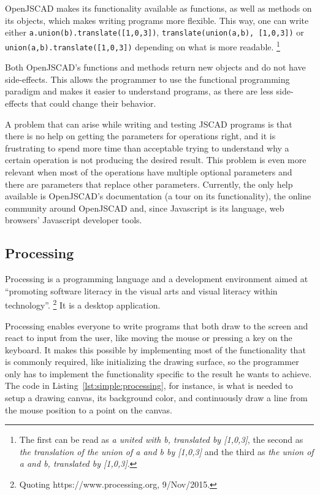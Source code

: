 OpenJSCAD makes its functionality available as functions, as well as methods on its objects, which makes writing programs more flexible.
This way, one can write either \texttt{a.union(b).translate([1,0,3])}, \texttt{translate(union(a,b), [1,0,3])} or \texttt{union(a,b).translate([1,0,3])} depending on what is more readable.%
\footnote{The first can be read as \emph{a united with b, translated by [1,0,3]}, the second as \emph{the translation of the union of a and b by [1,0,3]} and the third as \emph{the union of a and b, translated by [1,0,3]}.}

Both OpenJSCAD's functions and methods return new objects and do not have side-effects.
This allows the programmer to use the functional programming paradigm and makes it easier to understand programs, as there are less side-effects that could change their behavior.

A problem that can arise while writing and testing JSCAD programs is that there is no help on getting the parameters for operations right, and it is frustrating to spend more time than acceptable trying to understand why a certain operation is not producing the desired result.
This problem is even more relevant when most of the operations have multiple optional parameters and there are parameters that replace other parameters.
Currently, the only help available is OpenJSCAD's documentation (a tour on its functionality), the online community around OpenJSCAD and, since Javascript is its language, web browsers' Javascript developer tools.


\subsection{Processing}
\label{section:processing:related}
Processing\cite{reas2007processing} is a programming language and a development environment aimed at ``promoting software literacy in the visual arts and visual literacy within technology''.%
\footnote{Quoting https://www.processing.org, 9/Nov/2015.}
It is a desktop application.

Processing enables everyone to write programs that both draw to the screen and react to input from the user, like moving the mouse or pressing a key on the keyboard.
It makes this possible by implementing most of the functionality that is commonly required, like initializing the drawing surface, so the programmer only has to implement the functionality specific to the result he wants to achieve.
The code in Listing~\ref{lst:simple:processing}, for instance, is what is needed to setup a drawing canvas, its background color, and continuously draw a line from the mouse position to a point on the canvas.

